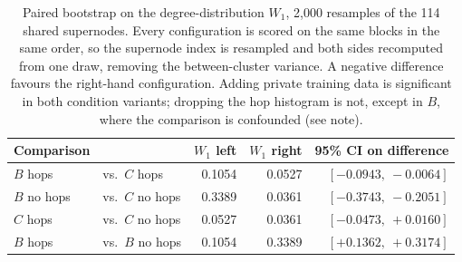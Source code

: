 
\begin{table}[H]
\centering
\caption{Paired bootstrap on the degree-distribution $W_1$, 2{,}000 resamples of
the 114 shared supernodes. Every configuration is scored on the same blocks in
the same order, so the supernode index is resampled and both sides recomputed
from one draw, removing the between-cluster variance. A negative difference
favours the right-hand configuration. Adding private training data is significant
in both condition variants; dropping the hop histogram is not, except in $B$,
where the comparison is confounded (see note).}\label{tab:dintra-k4-bootstrap}
\begin{tabular}{llrrr}
\toprule
Comparison & & $W_1$ left & $W_1$ right & 95\% CI on difference \\
\midrule
$B$ hops    & vs.\ $C$ hops    & 0.1054 & 0.0527 & $[-0.0943,\ -0.0064]$ \\
$B$ no hops & vs.\ $C$ no hops & 0.3389 & 0.0361 & $[-0.3743,\ -0.2051]$ \\
$C$ hops    & vs.\ $C$ no hops & 0.0527 & 0.0361 & $[-0.0473,\ +0.0160]$ \\
$B$ hops    & vs.\ $B$ no hops & 0.1054 & 0.3389 & $[+0.1362,\ +0.3174]$ \\
\bottomrule
\end{tabular}
\end{table}

